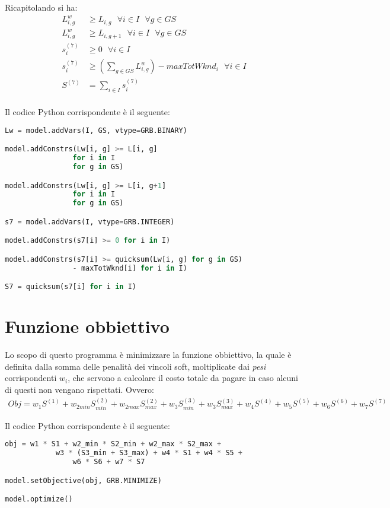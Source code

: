 Ricapitolando si ha:
\begin{equation}
\begin{split}
L_{i, g}^w &\geq L_{i, g} ~~~ \forall i \in I ~~~ \forall g \in GS \\
L_{i, g}^w &\geq L_{i, g+1} ~~~ \forall i \in I ~~~ \forall g \in GS \\
s^{(7)}_{i} &\geq 0  ~~~ \forall i \in I \\
s^{(7)}_{i} &\geq (\sum_{g \in GS} L_{i, g}^w ) - maxTotWknd_i ~~~ \forall i \in I \\
S^{(7)} &= \sum_{i \in I} s^{(7)}_{i} \\
\end{split}
\end{equation}

Il codice Python corrispondente è il seguente:
\begin{lstlisting}[language=Python]
Lw = model.addVars(I, GS, vtype=GRB.BINARY)

model.addConstrs(Lw[i, g] >= L[i, g] 
                for i in I
                for g in GS)

model.addConstrs(Lw[i, g] >= L[i, g+1] 
                for i in I
                for g in GS)

s7 = model.addVars(I, vtype=GRB.INTEGER)

model.addConstrs(s7[i] >= 0 for i in I)

model.addConstrs(s7[i] >= quicksum(Lw[i, g] for g in GS) 
                - maxTotWknd[i] for i in I)

S7 = quicksum(s7[i] for i in I)
\end{lstlisting}


\section{Funzione obbiettivo}
Lo scopo di questo programma è minimizzare la funzione obbiettivo, la quale è definita dalla somma delle penalità dei vincoli soft, moltiplicate dai \textit{pesi} corrispondenti $w_i$, che servono a calcolare il costo totale da pagare in caso alcuni di questi non vengano rispettati. Ovvero:
\begin{gather}
Obj = w_1 S^{(1)} + w_{2min} S^{(2)}_{min} + w_{2max} S^{(2)}_{max} + w_3 S^{(3)}_{min} + w_3 S^{(3)}_{max} + w_4 S^{(4)} + w_5 S^{(5)} + w_6 S^{(6)} + w_7 S^{(7)} 
\end{gather}

Il codice Python corrispondente è il seguente:
\begin{lstlisting}[language=Python]
obj = w1 * S1 + w2_min * S2_min + w2_max * S2_max + 
			w3 * (S3_min + S3_max) + w4 * S1 + w4 * S5 + 
				w6 * S6 + w7 * S7

model.setObjective(obj, GRB.MINIMIZE)

model.optimize()
\end{lstlisting}





